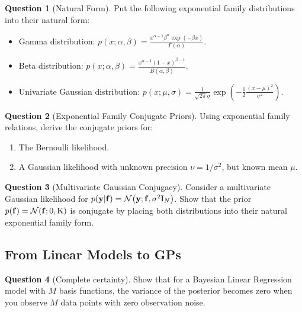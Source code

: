 \documentclass[a4paper]{article}
\theoremstyle{definition}
\newtheorem{question}{Question}
\begin{document}
\begin{question}[Natural Form]
\label{q:natural-form}
Put the following exponential family distributions into their natural form:
\begin{itemize}
\item Gamma distribution: $p( x ; \alpha, \beta ) = \frac{ x^ {\alpha - 1} \beta^\alpha \exp\left( - \beta x \right) }{ \Gamma(\alpha) }$.
\item Beta distribution: $p( x ; \alpha, \beta ) = \frac{ x^{ \alpha - 1} ( 1 - x )^{ \beta - 1 } }{ B( \alpha, \beta )}$.
\item Univariate Gaussian distribution: $p( x ; \mu, \sigma ) = \frac{ 1 }{ \sqrt{2 \pi } \sigma } \exp\left( - \frac{ 1 }{ 2 } \frac{ (x - \mu )^2 }{ \sigma^2 } \right)$.
\end{itemize}
\end{question}


\begin{question}[Exponential Family Conjugate Priors]
\label{q:cp-exp-fam-examples}
Using exponential family relations, derive the conjugate priors for:
\begin{enumerate}
\item The Bernoulli likelihood.
\item A Gaussian likelihood with unknown precision $\nu = 1/\sigma^2$, but known mean $\mu$.
\end{enumerate}
\end{question}


\begin{question}[Multivariate Gaussian Conjugacy]
\label{q:cp-gaussian}
Consider a multivariate Gaussian likelihood for $p(\vy|\vf) = \NormDist{\vy; \vf, \sigma^2\mathrm I_N}$. Show that the prior $p(\vf) = \NormDist{\vf; 0, \mathrm K}$ is conjugate by placing both distributions into their natural exponential family form.
\end{question}


\subsection{From Linear Models to GPs}
\begin{question}[Complete certainty]
\label{q:lmgp-cert}
Show that for a Bayesian Linear Regression model with $M$ basis functions, the variance of the posterior becomes zero when you observe $M$ data points with zero observation noise.
\end{question}
\end{document}
